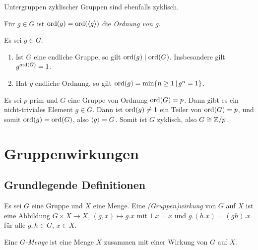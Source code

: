 \begin{corollary}
  Untergruppen zyklischer Gruppen sind ebenfalls zyklisch.
\end{corollary}

\begin{definition}
  Für $g \in G$ ist $\operatorname{ord}(g) = \operatorname{ord}(\langle g\rangle)$ die \emph{Ordnung von $g$}.
\end{definition}

\begin{lemma}
  Es sei $g \in G$.
  \begin{enumerate}
    \item
      Ist $G$ eine endliche Gruppe, so gilt $\operatorname{ord}(g) \mathrel{|} \operatorname{ord}(G)$.
      Insbesondere gilt $g^{\operatorname{ord}(G)} = 1$.
    \item
      Hat $g$ endliche Ordnung, so gilt $\ord{g} = \min \{ n \geq 1 \suchthat g^n = 1 \}$.
  \end{enumerate}
\end{lemma}

\begin{example}
  Es sei $p$ prim und $G$ eine Gruppe von Ordnung $\operatorname{ord}(G) = p$.
  Dann gibt es ein nicht-triviales Element $g \in G$.
  Dann ist $\operatorname{ord}(g) \neq 1$ ein Teiler von $\operatorname{ord}(G) = p$, und somit $\operatorname{ord}(g) = \operatorname{ord}(G)$, also $\langle g\rangle = G$.
  Somit ist $G$ zyklisch, also $G \cong \mathbb{Z}/p$.
\end{example}






\section{Gruppenwirkungen}



\subsection{Grundlegende Definitionen}

\begin{definition}
  Es sei $G$ eine Gruppe und $X$ eine Menge.
  Eine \emph{\textup(Gruppen\textup)wirkung} von $G$ auf $X$ ist eine Abbildung $G \times X \to X$, $(g,x) \mapsto g.x$ mit $1.x = x$ und $g.(h.x) = (gh).x$ für alle $g, h \in G$, $x \in X$.
  
  Eine \emph{$G$-Menge} ist eine Menge $X$ zusammen mit einer Wirkung von $G$ auf $X$.
\end{definition}

